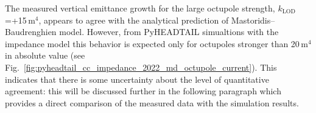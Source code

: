 



The measured vertical emittance growth for the large octupole strength, $k_\mathrm{LOD}$=+15\,$\mathrm{m^4}$, appears to agree with the analytical prediction of Mastoridis--Baudrenghien model. However, from PyHEADTAIL simualtions with the impedance model this behavior is expected only for octupoles stronger than 20\,$\mathrm{m^4}$ in absolute value (see Fig.~\ref{fig:pyheadtail_cc_impedance_2022_md_octupole_current}). This indicates that there is some uncertainty about the level of quantitative agreement: this will be discussed further in the following paragraph which provides a direct comparison of the measured data with the simulation results.


